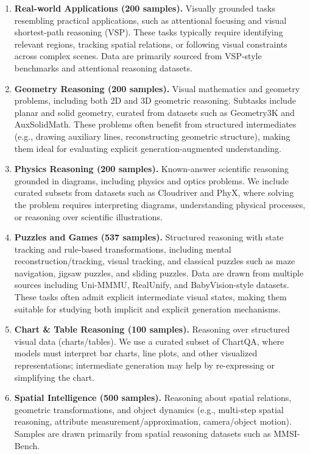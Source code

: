 \documentclass{article}
\theoremstyle{plain}
\theoremstyle{definition}
\theoremstyle{remark}
\begin{document}
\begin{enumerate}
    \item \textbf{Real-world Applications (200 samples).} Visually grounded tasks resembling practical applications, such as attentional focusing and visual shortest-path reasoning (VSP). These tasks typically require identifying relevant regions, tracking spatial relations, or following visual constraints across complex scenes. Data are primarily sourced from VSP-style benchmarks and attentional reasoning datasets.

    \item \textbf{Geometry Reasoning (200 samples).} Visual mathematics and geometry problems, including both 2D and 3D geometric reasoning. Subtasks include planar and solid geometry, curated from datasets such as Geometry3K and AuxSolidMath. These problems often benefit from structured intermediates (e.g., drawing auxiliary lines, reconstructing geometric structure), making them ideal for evaluating explicit generation-augmented understanding.

    \item \textbf{Physics Reasoning (200 samples).} Known-answer scientific reasoning grounded in diagrams, including physics and optics problems. We include curated subsets from datasets such as Cloudriver and PhyX, where solving the problem requires interpreting diagrams, understanding physical processes, or reasoning over scientific illustrations.

    \item \textbf{Puzzles and Games (537 samples).} Structured reasoning with state tracking and rule-based transformations, including mental reconstruction/tracking, visual tracking, and classical puzzles such as maze navigation, jigsaw puzzles, and sliding puzzles. Data are drawn from multiple sources including Uni-MMMU, RealUnify, and BabyVision-style datasets. These tasks often admit explicit intermediate visual states, making them suitable for studying both implicit and explicit generation mechanisms.

    \item \textbf{Chart \& Table Reasoning (100 samples).} Reasoning over structured visual data (charts/tables). We use a curated subset of ChartQA, where models must interpret bar charts, line plots, and other visualized representations; intermediate generation may help by re-expressing or simplifying the chart.

    \item \textbf{Spatial Intelligence (500 samples).} Reasoning about spatial relations, geometric transformations, and object dynamics (e.g., multi-step spatial reasoning, attribute measurement/approximation, camera/object motion). Samples are drawn primarily from spatial reasoning datasets such as MMSI-Bench.


\end{enumerate}
\end{document}
